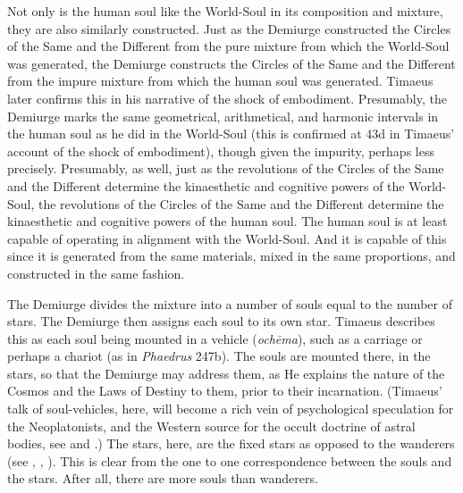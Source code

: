 Not only is the human soul like the World-Soul in its composition and mixture, they are also similarly constructed. Just as the Demiurge constructed the Circles of the Same and the Different from the pure mixture from which the World-Soul was generated, the Demiurge constructs the Circles of the Same and the Different from the impure mixture from which the human soul was generated. Timaeus later confirms this in his narrative of the shock of embodiment. Presumably, the Demiurge marks the same geometrical, arithmetical, and harmonic intervals in the human soul as he did in the World-Soul (this is confirmed at 43d in Timaeus' account of the shock of embodiment), though given the impurity, perhaps less precisely. Presumably, as well, just as the revolutions of the Circles of the Same and the Different determine the kinaesthetic and cognitive powers of the World-Soul, the revolutions of the Circles of the Same and the Different determine the kinaesthetic and cognitive powers of the human soul. The human soul is at least capable of operating in alignment with the World-Soul. And it is capable of this since it is generated from the same materials, mixed in the same proportions, and constructed in the same fashion.

The Demiurge divides the mixture into a number of souls equal to the number of stars. The Demiurge then assigns each soul to its own star. Timaeus describes this as each soul being mounted in a vehicle (\emph{ochēma}), such as a carriage or perhaps a chariot (as in \emph{Phaedrus} 247b). The souls are mounted there, in the stars, so that the Demiurge may address them, as He explains the nature of the Cosmos and the Laws of Destiny to them, prior to their incarnation. (Timaeus' talk of soul-vehicles, here, will become a rich vein of psychological speculation for the Neoplatonists, and the Western source for the occult doctrine of astral bodies, see \citealt[appendix 2]{Dodds:1963ul} and \citealt{Finamore:1985aa}.) The stars, here, are the fixed stars as opposed to the wanderers  (see \citealt[141--2 n13]{Archer-Hind:1888qd}, \citealt[255--6]{Taylor:1928qb}, \citealt[143]{Cornford:1935fk}). This is clear from the one to one correspondence between the souls and the stars. After all, there are more souls than wanderers.

